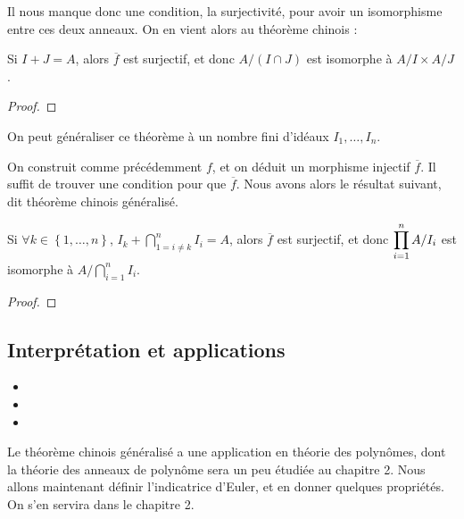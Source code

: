 Il nous manque donc une condition, la surjectivité, pour avoir un isomorphisme
entre ces deux anneaux.
On en vient alors au théorème chinois :

\begin{theorem}
	Si $I + J = A$, alors $\overline{f}$ est surjectif, et donc $A/(I \cap
	J)$ est isomorphe à $A/I \times A/J$.
\end{theorem}

\ifdefined\outputproof
\begin{proof}

\end{proof}
\fi

On peut généraliser ce théorème à un nombre fini d'idéaux $I_{1}, \ldots,
I_{n}$.

On construit comme précédemment $f$, et on déduit un morphisme injectif
$\overline{f}$. Il suffit de trouver une condition pour que $\overline{f}$. Nous
avons alors le résultat suivant, dit théorème chinois généralisé.

\begin{theorem}
	Si $\forall k \in \left\{1, \ldots, n\right\}$, $I_{k} + \displaystyle
	\bigcap_{1 = i \ne k}^{n} I_{i} = A$, alors $\overline{f}$ est surjectif, et
	donc $\displaystyle \prod_{i = 1}^{n} A/I_{i}$ est isomorphe à $\displaystyle A/\bigcap_{i = 1}^{n}
	I_{i}$.
\end{theorem}

\ifdefined\outputproof
\begin{proof}

\end{proof}
\fi

\subsection{Interprétation et applications}

\begin{exemple}
	\begin{itemize}
		\item
		\item
		\item
	\end{itemize}
\end{exemple}

Le théorème chinois généralisé a une application en théorie des polynômes, dont
la théorie des anneaux de polynôme sera un peu étudiée au chapitre 2.
Nous allons maintenant définir l'indicatrice d'Euler, et en donner quelques
propriétés.
On s'en servira dans le chapitre 2.

